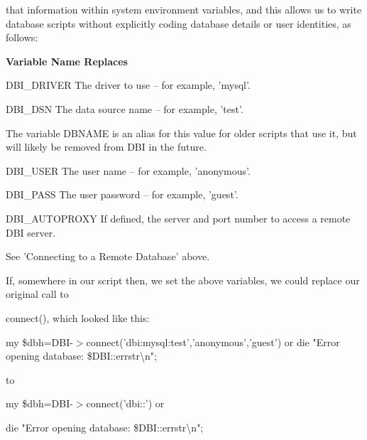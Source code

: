 \documentclass[a4paper,11pt]{book}
\begin{document}
\noindent that information within system environment variables, and this allows us to write database scripts without explicitly coding database details or user identities, as follows:

\noindent 

\noindent 

\noindent \textbf{Variable Name Replaces}

\noindent 

\noindent DBI\_DRIVER The driver to use -- for example, 'mysql'.

\noindent 

\noindent DBI\_DSN The data source name -- for example, 'test'.

\noindent 

\noindent The variable DBNAME is an alias for this value for older scripts that use it, but will likely be removed from DBI in the future.

\noindent 

\noindent DBI\_USER The user name -- for example, 'anonymous'.

\noindent 

\noindent DBI\_PASS The user password -- for example, 'guest'.

\noindent 

\noindent DBI\_AUTOPROXY If defined, the server and port number to access a remote DBI server.

\noindent 

\noindent See 'Connecting to a Remote Database' above.

\noindent 

\noindent 

\noindent If, somewhere in our script then, we set the above variables, we could replace our original call to

\noindent connect(), which looked like this:

\noindent 

\noindent my \$dbh=DBI-$>$connect('dbi:mysql:test','anonymous','guest') or die "Error opening database: \$DBI::errstr\textbackslash n";

\noindent 

\noindent to

\noindent 

\noindent my \$dbh=DBI-$>$connect('dbi::') or

\noindent die "Error opening database: \$DBI::errstr\textbackslash n";

\noindent 

\noindent 
\end{document}
